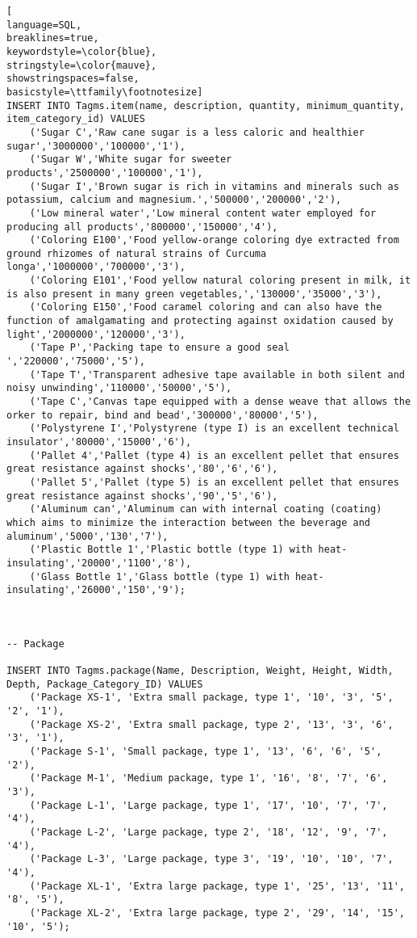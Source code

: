 \begin{lstlisting}[
language=SQL,
breaklines=true,
keywordstyle=\color{blue},
stringstyle=\color{mauve},
showstringspaces=false,
basicstyle=\ttfamily\footnotesize]
INSERT INTO Tagms.item(name, description, quantity, minimum_quantity, item_category_id) VALUES
    ('Sugar C','Raw cane sugar is a less caloric and healthier sugar','3000000','100000','1'),
    ('Sugar W','White sugar for sweeter products','2500000','100000','1'),
    ('Sugar I','Brown sugar is rich in vitamins and minerals such as potassium, calcium and magnesium.','500000','200000','2'),
    ('Low mineral water','Low mineral content water employed for producing all products','800000','150000','4'),
    ('Coloring E100','Food yellow-orange coloring dye extracted from ground rhizomes of natural strains of Curcuma longa','1000000','700000','3'),
    ('Coloring E101','Food yellow natural coloring present in milk, it is also present in many green vegetables,','130000','35000','3'),
    ('Coloring E150','Food caramel coloring and can also have the function of amalgamating and protecting against oxidation caused by light','2000000','120000','3'),
    ('Tape P','Packing tape to ensure a good seal ','220000','75000','5'),
    ('Tape T','Transparent adhesive tape available in both silent and noisy unwinding','110000','50000','5'),
    ('Tape C','Canvas tape equipped with a dense weave that allows the orker to repair, bind and bead','300000','80000','5'),
    ('Polystyrene I','Polystyrene (type I) is an excellent technical insulator','80000','15000','6'),
    ('Pallet 4','Pallet (type 4) is an excellent pellet that ensures great resistance against shocks','80','6','6'),
    ('Pallet 5','Pallet (type 5) is an excellent pellet that ensures great resistance against shocks','90','5','6'),
    ('Aluminum can','Aluminum can with internal coating (coating) which aims to minimize the interaction between the beverage and aluminum','5000','130','7'),
    ('Plastic Bottle 1','Plastic bottle (type 1) with heat-insulating','20000','1100','8'),
    ('Glass Bottle 1','Glass bottle (type 1) with heat-insulating','26000','150','9');



-- Package

INSERT INTO Tagms.package(Name, Description, Weight, Height, Width, Depth, Package_Category_ID) VALUES
    ('Package XS-1', 'Extra small package, type 1', '10', '3', '5', '2', '1'),
    ('Package XS-2', 'Extra small package, type 2', '13', '3', '6', '3', '1'),
    ('Package S-1', 'Small package, type 1', '13', '6', '6', '5', '2'),
    ('Package M-1', 'Medium package, type 1', '16', '8', '7', '6', '3'),
    ('Package L-1', 'Large package, type 1', '17', '10', '7', '7', '4'),
    ('Package L-2', 'Large package, type 2', '18', '12', '9', '7', '4'),
    ('Package L-3', 'Large package, type 3', '19', '10', '10', '7', '4'),
    ('Package XL-1', 'Extra large package, type 1', '25', '13', '11', '8', '5'),
    ('Package XL-2', 'Extra large package, type 2', '29', '14', '15', '10', '5');




\end{lstlisting}
